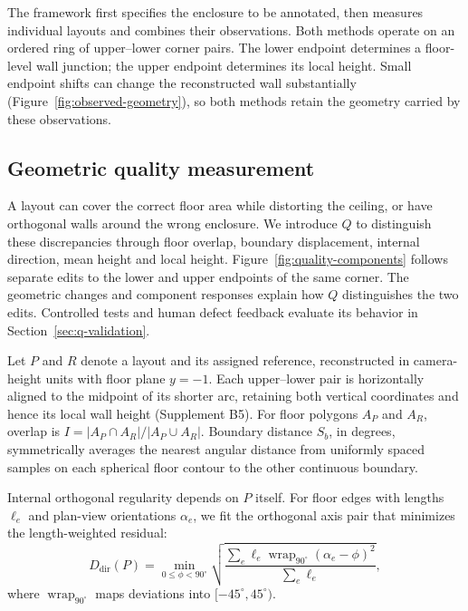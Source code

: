 \label{sec:methods}

The framework first specifies the enclosure to be annotated, then measures individual layouts and combines their observations. Both methods operate on an ordered ring of upper--lower corner pairs. The lower endpoint determines a floor-level wall junction; the upper endpoint determines its local height. Small endpoint shifts can change the reconstructed wall substantially (Figure~\ref{fig:observed-geometry}), so both methods retain the geometry carried by these observations.



\subsection{Geometric quality measurement}
\label{sec:quality}

A layout can cover the correct floor area while distorting the ceiling, or have orthogonal walls around the wrong enclosure. We introduce $Q$ to distinguish these discrepancies through floor overlap, boundary displacement, internal direction, mean height and local height. Figure~\ref{fig:quality-components} follows separate edits to the lower and upper endpoints of the same corner. The geometric changes and component responses explain how $Q$ distinguishes the two edits. Controlled tests and human defect feedback evaluate its behavior in Section~\ref{sec:q-validation}.



Let $P$ and $R$ denote a layout and its assigned reference, reconstructed in camera-height units with floor plane $y=-1$. Each upper--lower pair is horizontally aligned to the midpoint of its shorter arc, retaining both vertical coordinates and hence its local wall height (Supplement B5). For floor polygons $A_P$ and $A_R$, overlap is $I=|A_P\cap A_R|/|A_P\cup A_R|$. Boundary distance $S_b$, in degrees, symmetrically averages the nearest angular distance from uniformly spaced samples on each spherical floor contour to the other continuous boundary.

Internal orthogonal regularity depends on $P$ itself. For floor edges with lengths $\ell_e$ and plan-view orientations $\alpha_e$, we fit the orthogonal axis pair that minimizes the length-weighted residual:
\begin{equation}
 D_{\mathrm{dir}}(P)=\min_{0\leq\phi<90^\circ}
 \sqrt{\frac{\sum_e\ell_e\operatorname{wrap}_{90^\circ}(\alpha_e-\phi)^2}{\sum_e\ell_e}},
 \label{eq:direction}
\end{equation}
where $\operatorname{wrap}_{90^\circ}$ maps deviations into $[-45^\circ,45^\circ)$.


